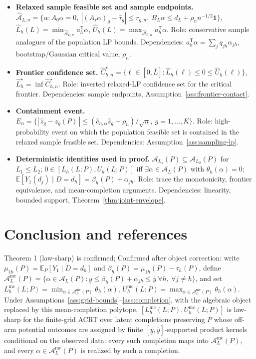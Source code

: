 \documentclass[11pt]{article}
\newcommand{\E}{\mathbb{E}}
\newcommand{\one}{\mathbf{1}}
\newcommand{\transpose}{\mathsf{T}}
\theoremstyle{definition}
\theoremstyle{plain}
\theoremstyle{remark}
\begin{document}
\begin{itemize}[leftmargin=*]
  \item \textbf{Relaxed sample feasible set and sample endpoints.} \(\widehat{\mathcal A}_{L,n}=\{\alpha:A_0\alpha=0,\ |(A_\tau\alpha)_g-\widehat\tau_g|\le r_{g,n},\ B_L\alpha\le d_L+\rho_n n^{-1/2}\one\}\), \(\widehat L_h(L)=\min_{\widehat{\mathcal A}_{L,n}}a_h^\transpose\alpha\), \(\widehat U_h(L)=\max_{\widehat{\mathcal A}_{L,n}}a_h^\transpose\alpha\).  Role: conservative sample analogues of the population LP bounds.  Dependencies: \(a_h^\transpose\alpha=\sum_j q_{jh}\alpha_{jh}\), bootstrap/Gaussian critical value, \(\rho_n\).
  \item \textbf{Frontier confidence set.} \(\widehat C_{h,n}^\star=\{\ell\in[0,\bar L]:\widehat L_h(\ell)\le0\le\widehat U_h(\ell)\}\), \(\widehat L_h^\star=\inf\widehat C_{h,n}^\star\).  Role: inverted relaxed-LP confidence set for the critical frontier.  Dependencies: sample endpoints, Assumption~\ref{ass:frontier-contact}.
  \item \textbf{Containment event.} \(E_n=\{|\,\widehat z_g-z_g(P)\,|\le(\widehat c_{n,\alpha}\widehat s_g+\rho_n)/\sqrt n,\ g=1,\ldots,K\}\).  Role: high-probability event on which the population feasible set is contained in the relaxed sample feasible set.  Dependencies: Assumption~\ref{ass:sampling-lp}.
  \item \textbf{Deterministic identities used in proof.} \(\mathcal A_{L_1}(P)\subseteq\mathcal A_{L_2}(P)\) for \(L_1\le L_2\); \(0\in[L_h(L;P),U_h(L;P)]\) iff \(\exists \alpha\in\mathcal A_L(P)\) with \(\theta_h(\alpha)=0\); \(\E[Y_1(d_j)\mid D=d_h]=\beta_h(P)+\alpha_{jh}\).  Role: trace the monotonicity, frontier equivalence, and mean-completion arguments.  Dependencies: linearity, bounded support, Theorem~\ref{thm:joint-envelope}.
\end{itemize}

\section{Conclusion and references}
Theorem 1 (law-sharp) is confirmed; Confirmed after object correction: write \(\mu_{1h}(P)=\E_P[Y_1\mid D=d_h]\) and \(\beta_h(P)=\mu_{1h}(P)-\tau_h(P)\), define \(\mathcal A_L^{\mathrm{mc}}(P)=\{\alpha\in\mathcal A_L(P):\underline y\le \beta_h(P)+\alpha_{jh}\le\overline y\ \forall h,\ \forall j\ne h\}\), and set \(L_h^{\mathrm{mc}}(L;P)=\min_{\alpha\in\mathcal A_L^{\mathrm{mc}}(P)}\theta_h(\alpha)\), \(U_h^{\mathrm{mc}}(L;P)=\max_{\alpha\in\mathcal A_L^{\mathrm{mc}}(P)}\theta_h(\alpha)\). Under Assumptions~\ref{ass:grid-bounds}--\ref{ass:completion}, with the algebraic object replaced by this mean-completion polytope, \([L_h^{\mathrm{mc}}(L;P),U_h^{\mathrm{mc}}(L;P)]\) is law-sharp for the finite-grid ACRT over latent completions preserving \(P\) whose off-arm potential outcomes are assigned by finite \([\underline y,\overline y]\)-supported product kernels conditional on the observed data: every such completion maps into \(\mathcal A_L^{\mathrm{mc}}(P)\), and every \(\alpha\in\mathcal A_L^{\mathrm{mc}}(P)\) is realized by such a completion.
\end{document}
